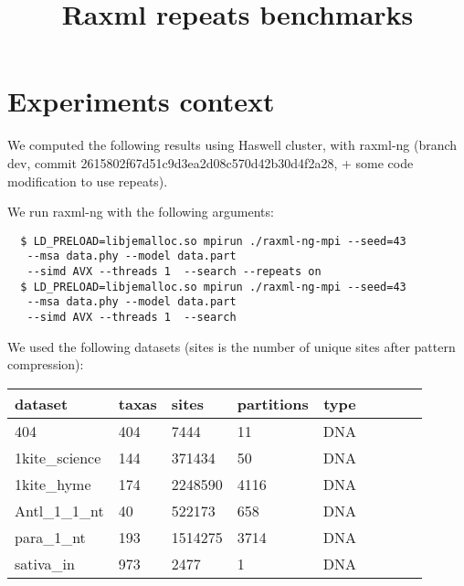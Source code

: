 \documentclass[a4paper]{article}
\begin{document}
\newcommand*{\figuretitle}[1]{%
    {\centering%
    \textbf{#1}%
    \par\medskip}%
}


\title{Raxml repeats benchmarks}
\maketitle


\section{Experiments context}

\noindent We computed the following results using Haswell cluster, with raxml-ng (branch dev, commit 2615802f67d51c9d3ea2d08c570d42b30d4f2a28, + some code modification to use repeats). 

We run raxml-ng with the following arguments:
\lstset{language=sh}
\begin{lstlisting}
  $ LD_PRELOAD=libjemalloc.so mpirun ./raxml-ng-mpi --seed=43 
   --msa data.phy --model data.part
   --simd AVX --threads 1  --search --repeats on
  $ LD_PRELOAD=libjemalloc.so mpirun ./raxml-ng-mpi --seed=43
   --msa data.phy --model data.part
   --simd AVX --threads 1  --search 
\end{lstlisting}

We used the following datasets (sites is the number of unique sites after pattern compression):

\begin{tabular}{|l|l|l|l|c|c|l|l|c|}
\hline dataset                    & taxas & sites    & partitions & type\\
\hline 404                        & 404   &  7444    & 11         & DNA   \\
\hline 1kite\_science             & 144   &  371434  & 50         & DNA   \\
\hline 1kite\_hyme                & 174   &  2248590 & 4116       & DNA  \\
\hline Antl\_1\_1\_nt             & 40    &  522173  & 658        & DNA  \\
\hline para\_1\_nt                & 193   &  1514275 & 3714       & DNA   \\
\hline sativa\_in				  & 973   &  2477    & 1          & DNA \\
\hline 
\end{tabular}\newline
\newline
\end{document}
